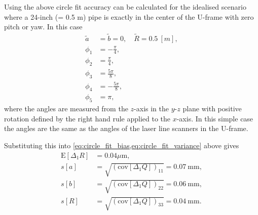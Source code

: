 Using the above circle fit accuracy can be calculated for the idealised scenario where a 24-inch (= 0.5 m) pipe is exactly in the center of the U-frame with zero pitch or yaw. In this case
\begin{align*}
    \tilde{a} & = \tilde{b} = 0, \quad \tilde{R} = 0.5 \ [m], \\
    \phi_1    & = -\frac{\pi}{4},                             \\
    \phi_2    & = \frac{\pi}{4},                              \\
    \phi_3    & =  \frac{5\pi}{8},                            \\
    \phi_4    & = -\frac{5\pi}{8},                            \\
    \phi_5    & = \pi,
\end{align*}
where the angles are measured from the $z$-axis in the $y$-$z$ plane with positive rotation defined by the right hand rule applied to the $x$-axis. In this simple case the angles are the same as the angles of the laser line scanners in the U-frame.

Substituting this into \cref{eq:circle_fit_bias,eq:circle_fit_variance} above gives
\begin{align*}
    \text{E}[\Delta_1 R] & = 0.04 \mu \text{m},                                     \\
    s[a]                 & = \sqrt{(\text{cov}[\Delta_1 Q])_{11}} = 0.07 \ \text{mm}, \\
    s[b]                 & = \sqrt{(\text{cov}[\Delta_1 Q])_{22}} = 0.06 \ \text{mm}, \\
    s[R]                 & = \sqrt{(\text{cov}[\Delta_1 Q])_{33}} = 0.04 \ \text{mm}.
\end{align*}